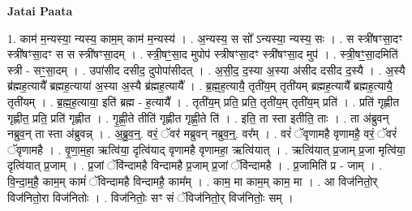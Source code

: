 \documentclass[17pt]{extarticle}
\begin{document}
\textbf{Jatai Paata} \newline

1. काम॑ म॒न्यस्या॒ न्यस्य॒ काम॒म् काम॑ म॒न्यस्य॑ । . अ॒न्यस्य॒ स सो᳚ ऽन्यस्या॒ न्यस्य॒ सः । . स स्त्री॑षꣳसा॒दꣳ स्त्री॑षꣳसा॒दꣳ स स स्त्री॑षꣳसा॒दम् । . स्त्री॒षꣳ॒॒सा॒द मुपोप॑ स्त्रीषꣳसा॒दꣳ स्त्री॑षꣳसा॒द मुप॑ । . स्त्री॒षꣳ॒॒सा॒दमिति॑ स्त्री - सꣳ॒॒सा॒दम् । . उपा॑सीद दसीद॒ दुपोपा॑सीदत् । . अ॒सी॒द॒ द॒स्या अ॒स्या अ॑सीद दसीद द॒स्यै । . अ॒स्यै ब्र॑ह्मह॒त्यायै᳚ ब्रह्मह॒त्याया॑ अ॒स्या अ॒स्यै ब्र॑ह्मह॒त्यायै᳚ । . ब्र॒ह्म॒ह॒त्यायै॒ तृती॑य॒म् तृती॑यम् ब्रह्मह॒त्यायै᳚ ब्रह्मह॒त्यायै॒ तृती॑यम् । . ब्र॒ह्म॒ह॒त्याया॒ इति॑ ब्रह्म - ह॒त्यायै᳚ । . तृती॑य॒म् प्रति॒ प्रति॒ तृती॑य॒म् तृती॑य॒म् प्रति॑ । . प्रति॑ गृह्णीत गृह्णीत॒ प्रति॒ प्रति॑ गृह्णीत । . गृ॒ह्णी॒ते तीति॑ गृह्णीत गृह्णी॒ते ति॑ । . इति॒ ता स्ता इतीति॒ ताः । . ता अ॑ब्रुवन् नब्रुव॒न् ता स्ता अ॑ब्रुवन्न् । . अ॒ब्रु॒व॒न्॒. वरं॒ ॅवर॑ मब्रुवन् नब्रुव॒न्॒. वर᳚म् । . वरं॑ ॅवृणामहै वृणामहै॒ वरं॒ ॅवरं॑ ॅवृणामहै । . वृ॒णा॒म॒हा॒ ऋत्वि॑या॒ दृत्वि॑याद् वृणामहै वृणामहा॒ ऋत्वि॑यात् । . ऋत्वि॑यात् प्र॒जाम् प्र॒जा मृत्वि॑या॒ दृत्वि॑यात् प्र॒जाम् । . प्र॒जां ॅवि॑न्दामहै विन्दामहै प्र॒जाम् प्र॒जां ॅवि॑न्दामहै । . प्र॒जामिति॑ प्र - जाम् । . वि॒न्दा॒म॒है॒ काम॒म् कामं॑ ॅविन्दामहै विन्दामहै॒ काम᳚म् । . काम॒ मा काम॒म् काम॒ मा । . आ विज॑नितो॒र् विज॑नितो॒रा विज॑नितोः । . विज॑नितोः॒ सꣳ सं ॅविज॑नितो॒र् विज॑नितोः॒ सम् । \newline
\end{document}
